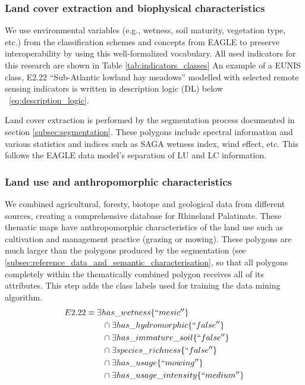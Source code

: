 \documentclass[authoryear, review,12pt,number]{elsarticle}
\begin{document}
\subsubsection{Land cover extraction and biophysical characteristics}
\label{subsec:LC_biophysical}
We use environmental variables (e.g., wetness, soil maturity, vegetation type,
etc.) from the classification schemes and concepts from EAGLE to preserve
interoperability by using this well-formalized vocabulary. All used indicators
for this research are shown in Table \ref{tab:indicators_classes} An example of
a EUNIS class, E2.22 ``Sub-Atlantic lowland hay meadows'' modelled with selected
remote sensing indicators is written in description logic (DL) below
~\ref{eq:description_logic}.

Land cover extraction is performed by the segmentation process documented in 
section \ref{subsec:segmentation}.  These polygons include spectral information 
and various statistics and indices such as SAGA wetness index, wind effect, 
etc. This follows the EAGLE data model's separation of LU and LC information.

\subsubsection{Land use and anthropomorphic characteristics}
\label{subsec:LU_anthropomorphic}
We combined agricultural, foresty, biotope and geological data from different
sources, creating a comprehensive database for Rhineland Palatinate. These
thematic maps have anthropomorphic characteristics of the land use such as
cultivation and management practice (grazing or mowing). These polygons are much
larger than the polygons produced by the segmentation (see
\ref{subsec:reference_data_and_semantic_characterisation}, so
that all polygons completely within the thematically combined polygon receives
all of its attributes. This step adds the class labels used for training the
data mining algorithm. 
\begin{equation}
\begin{align*}
E2.22 &\equiv \exists has\_wetness \{``mesic''\} \\
&\qquad {} \cap \exists has\_hydromorphic \{``false''\} \\
&\qquad {} \cap \exists has\_immature\_soil \{``false''\} \\
&\qquad {} \cap \exists species\_richness \{``false''\} \\
&\qquad {} \cap \exists has\_usage \{``mowing''\} \\
&\qquad {} \cap \exists has\_usage\_intensity \{``medium''\} \\
\end{align*}
\label{eq:description_logic}
\end{equation}
\label{subsec:Selection_of_training_validation_data}
\end{document}
